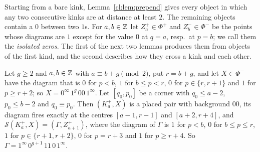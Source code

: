Starting from a bare kink, Lemma~\ref{cl:lem:prepend} gives every object in which any two consecutive kinks are at distance at least $2$. The remaining objects contain a $0$ between two $1$s. For $a,b\in\mathbb{Z}$ let $Z^+_a\in\Phi^+$ and $Z^-_b\in\Phi^-$ be the points whose diagrams are $1$ except for the value $0$ at $q=a$, resp.\ at $p=b$; we call them the \emph{isolated zeros}. The first of the next two lemmas produces them from objects of the first kind, and the second describes how they cross a kink and each other.

\begin{lemma}\label{cl:lem:B}
Let $g\ge2$ and $a,b\in\mathbb{Z}$ with $a\equiv b+g\pmod2$, put $r=b+g$, and let $X\in\Phi^-$ have the diagram that is $0$ for $p<b$, $1$ for $b\le p<r$, $0$ for $p\in\{r,r+1\}$ and $1$ for $p\ge r+2$; so $X=0^\infty\,1^g\,00\,1^\infty$. Let $[q_0,p_0]$ be a corner with $q_0\le a-2$, $p_0\le b-2$ and $q_0\equiv p_0$. Then $(K^+_a,X)$ is a placed pair with background $00$, its diagram fires exactly at the centres $[a-1,r-1]$ and $[a+2,r+4]$, and $\mathcal S(K^+_a,X)=(\Gamma,Z^+_{a+1})$, where the diagram of $\Gamma$ is $1$ for $p<b$, $0$ for $b\le p\le r$, $1$ for $p\in\{r+1,r+2\}$, $0$ for $p=r+3$ and $1$ for $p\ge r+4$. So $\Gamma=1^\infty\,0^{g+1}\,11\,0\,1^\infty$.
\end{lemma}

